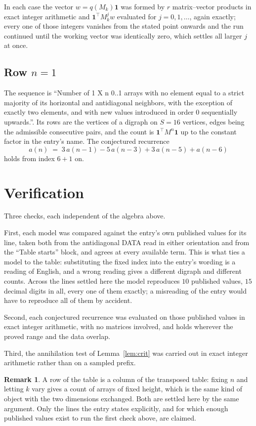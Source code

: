 \documentclass[11pt,a4paper]{article}
\theoremstyle{plain}
\theoremstyle{definition}
\newtheorem{remark}[theorem]{Remark}
\begin{document}
In each case the vector $w=q(M_k)\mathbf{1}$ was formed by $r$ matrix--vector products in
exact integer arithmetic and $\mathbf{1}^{\!\top}M_k^{j}w$ evaluated for $j=0,1,\dots$,
again exactly; every one of those integers vanishes from the stated point onwards and the run
continued until the working vector was identically zero, which settles all larger $j$ at once.

\subsection*{Row $n$$=1$}
The sequence is ``Number of 1 X n 0..1 arrays with no element equal to a strict majority of its horizontal and antidiagonal neighbors, with the exception of exactly two elements, and with new values introduced in order 0 sequentially upwards.''. Its rows are the vertices of a digraph on
$S=16$ vertices, edges being the admissible consecutive pairs, and the count is
$\mathbf{1}^{\!\top}M^{n}\mathbf{1}$ up to the constant factor in the entry's name.
The conjectured recurrence
\[
a(n)\;=\;3\,a(n-1) - 5\,a(n-3) + 3\,a(n-5) + a(n-6)
\]
holds from index $6+1$ on.

\section{Verification}

Three checks, each independent of the algebra above.

First, each model was compared against the entry's own published values for its line, taken
both from the antidiagonal DATA read in either orientation and from the ``Table starts''
block, and agrees at every available term. This is what ties a model to the table:
substituting the fixed index into the entry's wording is a reading of English, and a wrong
reading gives a different digraph and different counts. Across the lines settled here the
model reproduces $10$ published values, $15$ decimal digits in all, every one of
them exactly; a misreading of the entry would have to reproduce all of them by accident.

Second, each conjectured recurrence was evaluated on those published values in exact
integer arithmetic, with no matrices involved, and holds wherever the proved range and the
data overlap.

Third, the annihilation test of Lemma~\ref{lem:crit} was carried out in exact integer
arithmetic rather than on a sampled prefix.

\begin{remark}
A row of the table is a column of the transposed table: fixing $n$ and letting $k$ vary gives a
count of arrays of fixed height, which is the same kind of object with the two dimensions
exchanged. Both are settled here by the same argument. Only the lines the entry states
explicitly, and for which enough published values exist to run the first check above, are
claimed.
\end{remark}
\end{document}
